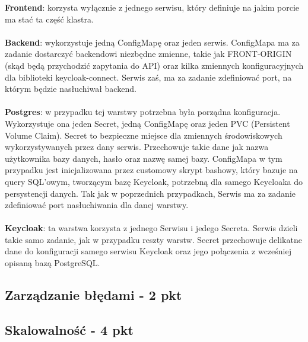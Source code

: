 \documentclass[12pt,a4paper]{article}
\begin{document}
\textbf{Frontend}: korzysta wyłącznie z jednego serwisu, który definiuje na jakim porcie ma stać ta część klastra.\\
\\
\textbf{Backend}: wykorzystuje jedną ConfigMapę oraz jeden serwis. ConfigMapa ma za zadanie dostarczyć backendowi niezbędne zmienne, takie jak FRONT-ORIGIN (skąd będą przychodzić zapytania do API) oraz kilka zmiennych konfiguracyjnych dla biblioteki keycloak-connect. Serwis zaś, ma za zadanie zdefiniować port, na którym będzie nasłuchiwał backend.\\
\\
\textbf{Postgres}: w przypadku tej warstwy potrzebna była porządna konfiguracja. Wykorzystuje ona jeden Secret, jedną ConfigMapę oraz jeden PVC (Persistent Volume Claim). Secret to bezpieczne miejsce dla zmiennych środowiskowych wykorzystywanych przez dany serwis. Przechowuje takie dane jak nazwa użytkownika bazy danych, hasło oraz nazwę samej bazy. ConfigMapa w tym przypadku jest inicjalizowana przez customowy skrypt bashowy, który bazuje na query SQL'owym, tworzącym bazę Keycloak, potrzebną dla samego Keycloaka do persystencji danych. Tak jak w poprzednich przypadkach, Serwis ma za zadanie zdefiniować port nasłuchiwania dla danej warstwy.\\
\\
\textbf{Keycloak}: ta warstwa korzysta z jednego Serwisu i jedego Secreta. Serwis dzieli takie samo zadanie, jak w przypadku reszty warstw. Secret przechowuje delikatne dane do konfiguracji samego serwisu Keycloak oraz jego połączenia z wcześniej opisaną bazą PostgreSQL.\\

\subsection{Zarządzanie błędami - 2 pkt}
\label{sec:ERD} 



\subsection{Skalowalność - 4 pkt}
\label{sec:ExamplesSection}

\end{document}
